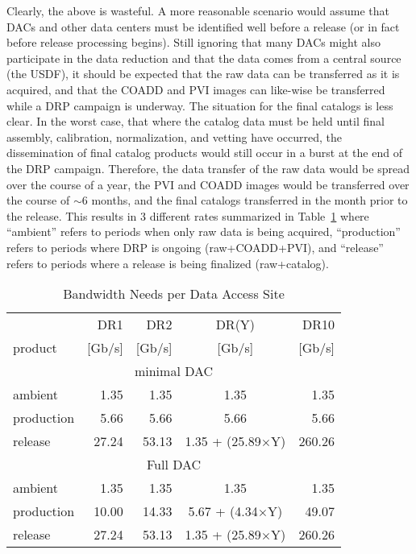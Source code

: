 Clearly, the above is wasteful.  A more reasonable scenario would assume that DACs and other 
data centers must be identified well before a release (or in fact before release processing begins).
Still ignoring that many DACs might also participate in the data reduction and that the data comes 
from a central source (the USDF), it should be expected that the raw data can be transferred as
it is acquired, and that the COADD and PVI images can like-wise be transferred while a DRP 
campaign is underway.  The situation for the final catalogs is less clear.  In the worst case, 
that where the catalog data must be held until final assembly, calibration, normalization, and 
vetting have occurred, the dissemination of final catalog products would still occur in a burst
at the end of the DRP campaign.  Therefore, the data transfer of the raw data would be spread 
over the course of a year, the PVI and COADD images would be transferred over the course of 
$\sim$6 months, and the final catalogs transferred in the month prior to the release.  This results 
in 3 different rates summarized in Table~\ref{tab_rate} where ``ambient'' refers to periods when 
only raw data is being acquired, ``production'' refers to periods where DRP is ongoing 
(raw+COADD+PVI), and ``release'' refers to periods where a release is being finalized 
(raw+catalog).


\begin{table}[!ht]
\caption{Bandwidth Needs per Data Access Site} 
\label{tab_rate}
\footnotesize
\centering
\begin{tabular}[]{|l|rrcr|}
\hline
\hline
            &   DR1   &  DR2   &  DR(Y)  &  DR10 \\
 product    &  [Gb/s] & [Gb/s] &  [Gb/s] & [Gb/s] \\
\hline
\multicolumn{5}{c}{minimal DAC} \\
\hline
 ambient    &  1.35  &  1.35  &  1.35      &  1.35  \\
 production &  5.66  &  5.66  &  5.66      &  5.66  \\
 release    & 27.24  & 53.13  &  1.35 + (25.89$\times$Y) & 260.26 \\
\hline
\multicolumn{5}{c}{Full DAC} \\
\hline
 ambient    &  1.35  &  1.35  &  1.35      &  1.35  \\
 production & 10.00  & 14.33  &  5.67 + (4.34$\times$Y) &  49.07 \\
 release    & 27.24  & 53.13  &  1.35 + (25.89$\times$Y) & 260.26 \\
\hline
\end{tabular}
\end{table}

